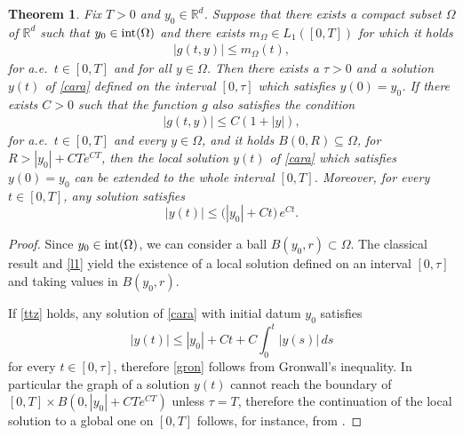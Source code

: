 \documentclass[A4paper,11pt]{article}
\newtheorem{theorem}{Theorem}[section]
\theoremstyle{definition}
\newcommand{\R}{\mathbb{R}}
\begin{document}
\begin{theorem}\label{cara-global}
Fix $T > 0$ and $y_0 \in \R^d$. Suppose that there exists a compact subset $\Omega$ of $\R^d$ such that $y_0 \in \textup{int}(\Omega)$ and there exists $m_{\Omega} \in L_1([0,T])$ for which it holds
\begin{align}\label{l1}
|g(t,y)|\le m_{\Omega}(t),
\end{align}
for a.e.\ $t \in [0,T]$ and for all $y \in \Omega$. Then there exists a $\tau > 0$ and a solution $y(t)$ of \eqref{cara} defined on the interval $[0,\tau]$ which satisfies $y(0)=y_0$. If there exists $C > 0$ such that the function $g$ also satisfies the condition
\begin{align}\label{ttz}
|g(t,y)|\le C(1+|y|),
\end{align}
for a.e.\ $t \in [0,T]$ and every $y \in \Omega$, and it holds $B(0,R) \subseteq \Omega$, for $R > |y_0| + CT e^{CT}$, then the local solution $y(t)$ of \eqref{cara} which satisfies $y(0)=y_0$ can be extended to the whole interval $[0,T]$. Moreover, for every $t \in [0,T]$, any solution satisfies
\begin{equation}\label{gron}
|y(t)|\le \Big(|y_0|+ Ct\Big) \,e^{Ct}.
\end{equation}
\end{theorem}

\begin{proof}
Since $y_0 \in \textup{int}(\Omega)$, we can consider a ball $B(y_0,r) \subset \Omega$. The classical result \cite[Chapter 1, Theorem 1]{Fil} and \eqref{l1} yield the existence of a local solution defined on an interval $[0,\tau]$ and taking values in $B(y_0,r)$.

If \eqref{ttz} holds, any solution of \eqref{cara} with initial datum $y_0$ satisfies
$$
|y(t)|\le |y_0|+ Ct+C\int_0^t |y(s)|\,ds
$$
for every $t \in [0,\tau]$, therefore \eqref{gron} follows from Gronwall's inequality. In particular the graph of a solution $y(t)$ cannot reach the boundary of $[0,T]\times B(0,|y_0|+CTe^{CT})$ unless $\tau=T$, therefore the continuation of the local solution to a global one on $[0,T]$ follows, for instance, from \cite[Chapter 1, Theorem 4]{Fil}.
\end{proof}
\end{document}
